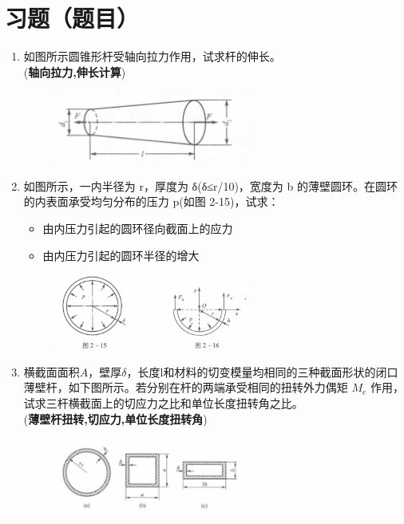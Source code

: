 \documentclass[12pt,a4paper]{article}
\newcounter{question}
\newenvironment{questions}{
    \setcounter{question}{0}
    \section*{习题（题目）}
    \begin{enumerate}[leftmargin=1.5em,label={\arabic*．}]
}{
    \end{enumerate}
}
\begin{document}
\begin{questions}
    \item 如图所示圆锥形杆受轴向拉力作用，试求杆的伸长。 \\ (\textbf{轴向拉力,伸长计算})
    
    \begin{figure}[H]
        \centering
        \includegraphics[width=0.6\textwidth]{figures/12.png}
    \end{figure}
    
    \item 如图所示，一内半径为 r，厚度为 δ(δ≤r/10)，宽度为 b 的薄壁圆环。在圆环的内表面承受均匀分布的压力 p(如图 2-15)，试求：
    \begin{itemize}
      \item 由内压力引起的圆环径向截面上的应力
      \item 由内压力引起的圆环半径的增大
    \end{itemize}

    \begin{figure}[H]
        \centering
        \includegraphics[width=0.6\textwidth]{figures/13.png}
    \end{figure}
    
    \item 横截面面积$A$，壁厚$\delta$，长度l和材料的切变模量均相同的三种截面形状的闭口薄壁杆，如下图所示。若分别在杆的两端承受相同的扭转外力偶矩 \( M_e \) 作用，试求三杆横截面上的切应力之比和单位长度扭转角之比。 \\ (\textbf{薄壁杆扭转,切应力,单位长度扭转角})
    
    \begin{figure}[H]
        \centering
        \includegraphics[width=0.6\textwidth]{figures/14.png}
    \end{figure}


\end{questions}
\end{document}
